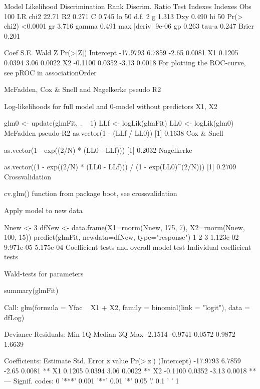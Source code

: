                       Model Likelihood     Discrimination    Rank Discrim.    
                         Ratio Test            Indexes          Indexes       
Obs           100    LR chi2      22.71    R2       0.271    C       0.745    
 lo            50    d.f.             2    g        1.313    Dxy     0.490    
 hi            50    Pr(> chi2) <0.0001    gr       3.716    gamma   0.491    
max |deriv| 9e-06                          gp       0.263    tau-a   0.247    
                                           Brier    0.201                     

          Coef     S.E.   Wald Z Pr(>|Z|)
Intercept -17.9793 6.7859 -2.65  0.0081  
X1          0.1205 0.0394  3.06  0.0022  
X2         -0.1100 0.0352 -3.13  0.0018  
For plotting the ROC-curve, see pROC in associationOrder

McFadden, Cox & Snell and Nagelkerke pseudo R2

Log-likelihoods for full model and 0-model without predictors X1, X2

glm0 <- update(glmFit, . ~ 1)
LLf  <- logLik(glmFit)
LL0  <- logLik(glm0)
McFadden pseudo-R2
as.vector(1 - (LLf / LL0))
[1] 0.1638
Cox & Snell

as.vector(1 - exp((2/N) * (LL0 - LLf)))
[1] 0.2032
Nagelkerke

as.vector((1 - exp((2/N) * (LL0 - LLf))) / (1 - exp(LL0)^(2/N)))
[1] 0.2709
Crossvalidation

cv.glm() function from package boot, see crossvalidation

Apply model to new data

Nnew  <- 3
dfNew <- data.frame(X1=rnorm(Nnew, 175, 7), X2=rnorm(Nnew, 100, 15))
predict(glmFit, newdata=dfNew, type="response")
        1         2         3 
1.123e-02 9.971e-05 5.175e-04 
Coefficient tests and overall model test
Individual coefficient tests

Wald-tests for parameters

summary(glmFit)

Call:
glm(formula = Yfac ~ X1 + X2, family = binomial(link = "logit"), 
    data = dfLog)

Deviance Residuals: 
    Min       1Q   Median       3Q      Max  
-2.1514  -0.9741   0.0572   0.9872   1.6639  

Coefficients:
            Estimate Std. Error z value Pr(>|z|)   
(Intercept) -17.9793     6.7859   -2.65   0.0081 **
X1            0.1205     0.0394    3.06   0.0022 **
X2           -0.1100     0.0352   -3.13   0.0018 **
---
Signif. codes:  0 '***' 0.001 '**' 0.01 '*' 0.05 '.' 0.1 ' ' 1 

